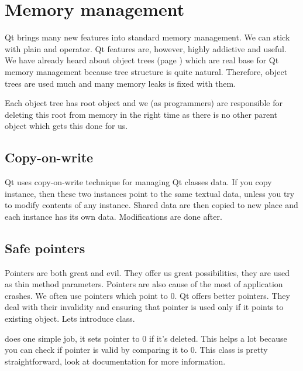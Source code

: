 \chapter{Memory management}\label{section:memorym}
Qt brings many new features into standard \cpp memory management. We can stick with plain and operator. Qt features are, however, highly addictive and useful. We have already heard about object trees (page \pageref{section:model}) which are real base for Qt memory management because tree structure is quite natural. Therefore, object trees are used much and many memory leaks is fixed with them.

Each object tree has root object and we (as programmers) are responsible for deleting this root from memory in the right time as there is no other parent object which gets this done for us.

\section{Copy-on-write}
Qt uses copy-on-write technique for managing Qt classes data. If you copy instance, then these two instances point to the same textual data, unless you try to modify contents of any instance. Shared data are then copied to new place and each instance has its own data. Modifications are done after. 

\section{Safe pointers}
Pointers are both great and evil. They offer us great possibilities, \eg they are used as thin method parameters. Pointers are also cause of the most of application crashes. We often use pointers which point to 0. Qt offers better pointers. They deal with their invalidity and ensuring that pointer is used only if it points to existing object. Lets introduce class. \citep[QPointer class]{various:qtdoc}

 does one simple job, it sets pointer to 0 if it's deleted. This helps a lot because you can check if pointer is valid by comparing it to 0. This class is pretty straightforward, look at documentation for more information.